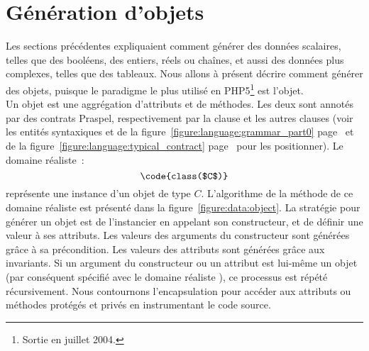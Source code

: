 \section{Génération d'objets}
\label{section:data:objects}

Les sections précédentes expliquaient comment générer des données scalaires,
telles que des booléens, des entiers, réels ou chaînes, et aussi des données
plus complexes, telles que des tableaux. Nous allons à présent décrire comment
générer des objets, puisque le paradigme le plus utilisé en PHP5\footnote{Sortie
en juillet 2004.} est l'objet. \\

Un objet est une aggrégation d'attributs et de méthodes. Les deux sont annotés
par des contrats Praspel, respectivement par la clause \ainvariant et les autres
clauses (voir les entités syntaxiques  et
 de la figure~\ref{figure:language:grammar_part0}
page~\pageref{figure:language:grammar_part0} et de la
figure~\ref{figure:language:typical_contract}
page~\pageref{figure:language:typical_contract} pour les positionner). Le
domaine réaliste~:
%
$$\code{class($C$)}$$
%
représente une instance d'un objet de type $C$. L'algorithme de la méthode
 de ce domaine réaliste est présenté dans la
figure~\ref{figure:data:object}.  La stratégie pour générer un objet est de
l'instancier en appelant son constructeur, et de définir une valeur à ses
attributs. Les valeurs des arguments du constructeur sont générées grâce à sa
précondition. Les valeurs des attributs sont générées grâce aux invariants. Si
un argument du constructeur ou un attribut est lui-même un objet (par conséquent
spécifié avec le domaine réaliste ), ce processus est répété
récursivement. Nous contournons l'encapsulation pour accéder aux attributs ou
méthodes protégés et privés en instrumentant le code source.


